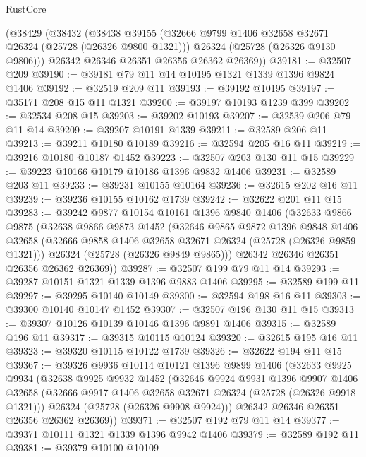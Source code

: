 \begin{lexlean}{RustCore}
\begin{coremodule}
    (@38429
      (@38432
        (@38438
          @39155
          (@32666 @9799 @1406 @32658 @32671 @26324 (@25728 (@26326 @9800 @1321)))
          @26324
          (@25728 (@26326 @9130 @9806)))
        @26342
        @26346
        @26351
        @26356
        @26362
        @26369))
@39181 := @32507 @209
@39190 := @39181 @79 @11 @14 @10195 @1321 @1339 @1396 @9824 @1406
@39192 := @32519 @209 @11
@39193 := @39192 @10195
@39197 := @35171 @208 @15 @11 @1321
@39200 := @39197 @10193 @1239 @399
@39202 := @32534 @208 @15
@39203 := @39202 @10193
@39207 := @32539 @206 @79 @11 @14
@39209 := @39207 @10191 @1339
@39211 := @32589 @206 @11
@39213 := @39211 @10180 @10189
@39216 := @32594 @205 @16 @11
@39219 := @39216 @10180 @10187 @1452
@39223 := @32507 @203 @130 @11 @15
@39229 := @39223 @10166 @10179 @10186 @1396 @9832 @1406
@39231 := @32589 @203 @11
@39233 := @39231 @10155 @10164
@39236 := @32615 @202 @16 @11
@39239 := @39236 @10155 @10162 @1739
@39242 := @32622 @201 @11 @15
@39283 := @39242
    @9877
    @10154
    @10161
    @1396
    @9840
    @1406
    (@32633
      @9866
      @9875
      (@32638
        @9866
        @9873
        @1452
        (@32646
          @9865
          @9872
          @1396
          @9848
          @1406
          @32658
          (@32666 @9858 @1406 @32658 @32671 @26324 (@25728 (@26326 @9859 @1321)))
          @26324
          (@25728 (@26326 @9849 @9865)))
        @26342
        @26346
        @26351
        @26356
        @26362
        @26369))
@39287 := @32507 @199 @79 @11 @14
@39293 := @39287 @10151 @1321 @1339 @1396 @9883 @1406
@39295 := @32589 @199 @11
@39297 := @39295 @10140 @10149
@39300 := @32594 @198 @16 @11
@39303 := @39300 @10140 @10147 @1452
@39307 := @32507 @196 @130 @11 @15
@39313 := @39307 @10126 @10139 @10146 @1396 @9891 @1406
@39315 := @32589 @196 @11
@39317 := @39315 @10115 @10124
@39320 := @32615 @195 @16 @11
@39323 := @39320 @10115 @10122 @1739
@39326 := @32622 @194 @11 @15
@39367 := @39326
    @9936
    @10114
    @10121
    @1396
    @9899
    @1406
    (@32633
      @9925
      @9934
      (@32638
        @9925
        @9932
        @1452
        (@32646
          @9924
          @9931
          @1396
          @9907
          @1406
          @32658
          (@32666 @9917 @1406 @32658 @32671 @26324 (@25728 (@26326 @9918 @1321)))
          @26324
          (@25728 (@26326 @9908 @9924)))
        @26342
        @26346
        @26351
        @26356
        @26362
        @26369))
@39371 := @32507 @192 @79 @11 @14
@39377 := @39371 @10111 @1321 @1339 @1396 @9942 @1406
@39379 := @32589 @192 @11
@39381 := @39379 @10100 @10109

\end{coremodule}
\end{lexlean}
